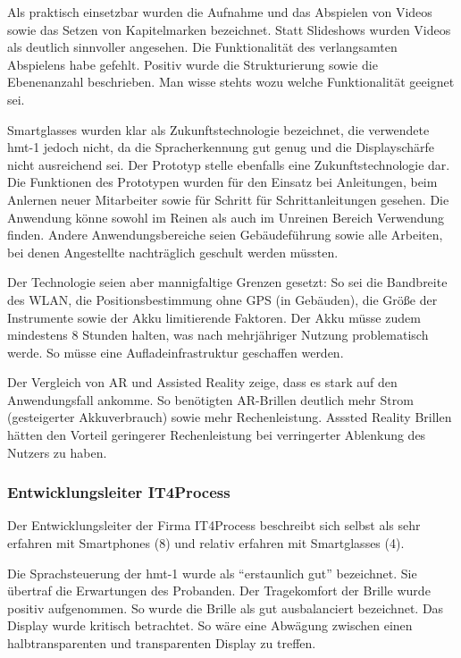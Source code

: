 Als praktisch einsetzbar wurden die Aufnahme und das Abspielen von Videos sowie das Setzen von Kapitelmarken bezeichnet. Statt Slideshows wurden Videos als deutlich sinnvoller angesehen. Die Funktionalität des verlangsamten Abspielens habe gefehlt. Positiv wurde die Strukturierung sowie die Ebenenanzahl beschrieben. Man wisse stehts wozu welche Funktionalität geeignet sei.

Smartglasses wurden klar als Zukunftstechnologie bezeichnet, die verwendete hmt-1 jedoch nicht, da die Spracherkennung gut genug und die Displayschärfe nicht ausreichend sei. Der Prototyp stelle ebenfalls eine Zukunftstechnologie dar. Die Funktionen des Prototypen wurden für den Einsatz bei Anleitungen, beim Anlernen neuer Mitarbeiter sowie für Schritt für Schrittanleitungen gesehen. Die Anwendung könne sowohl im Reinen als auch im Unreinen Bereich Verwendung finden. Andere Anwendungsbereiche seien Gebäudeführung sowie alle Arbeiten, bei denen Angestellte nachträglich geschult werden müssten. 

Der Technologie seien aber mannigfaltige Grenzen gesetzt: So sei die Bandbreite des WLAN, die Positionsbestimmung ohne GPS (in Gebäuden), die Größe der Instrumente sowie der Akku limitierende Faktoren. Der Akku müsse zudem mindestens 8 Stunden halten, was nach mehrjähriger Nutzung problematisch werde. So müsse eine Aufladeinfrastruktur geschaffen werden.

Der Vergleich von AR und Assisted Reality zeige, dass es stark auf den Anwendungsfall ankomme. So benötigten AR-Brillen deutlich mehr Strom (gesteigerter Akkuverbrauch) sowie mehr Rechenleistung. Asssted Reality Brillen hätten den Vorteil geringerer Rechenleistung bei verringerter Ablenkung des Nutzers zu haben.
%
%
\subsubsection{Entwicklungsleiter IT4Process}
Der Entwicklungsleiter der Firma IT4Process beschreibt sich selbst als sehr erfahren mit Smartphones (8) und relativ erfahren mit Smartglasses (4).

Die Sprachsteuerung der hmt-1 wurde als \enquote{erstaunlich gut} bezeichnet. Sie übertraf die Erwartungen des Probanden. Der Tragekomfort der Brille wurde positiv aufgenommen. So wurde die Brille als gut ausbalanciert bezeichnet. Das Display wurde kritisch betrachtet. So wäre eine Abwägung zwischen einen halbtransparenten und transparenten Display zu treffen. 

